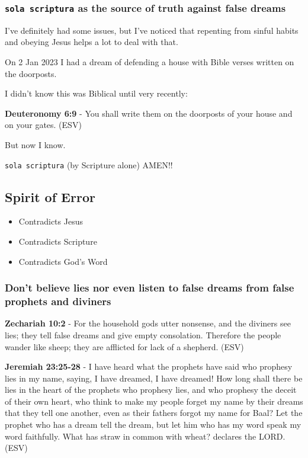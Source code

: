 \documentclass[11pt]{article}
\begin{document}
\subsubsection{\texttt{sola scriptura} as the source of truth against false dreams}
\label{sec:org92f1604}
I've definitely had some issues, but I've noticed that repenting from sinful habits and obeying Jesus helps a lot to deal with that.

On 2 Jan 2023 I had a dream of defending a house with Bible verses written
on the doorposts.

I didn't know this was Biblical until very recently:

\textbf{Deuteronomy 6:9} -  You shall write them on the doorposts of your house and on your gates.  (ESV)

But now I know.

\texttt{sola scriptura} (by Scripture alone) AMEN!!

\subsection{Spirit of Error}
\label{sec:orgfbdda8d}
\begin{itemize}
\item Contradicts Jesus
\item Contradicts Scripture
\item Contradicts God's Word
\end{itemize}

\subsubsection{Don't believe lies nor even listen to false dreams from false prophets and diviners}
\label{sec:orgfb35cd1}
\textbf{Zechariah 10:2} - For the household gods utter nonsense, and the diviners see lies; they tell false dreams and give empty consolation. Therefore the people wander like sheep; they are afflicted for lack of a shepherd. (ESV)

\textbf{Jeremiah 23:25-28} -  I have heard what the prophets have said who prophesy lies in my name, saying, I have dreamed, I have dreamed! How long shall there be lies in the heart of the prophets who prophesy lies, and who prophesy the deceit of their own heart, who think to make my people forget my name by their dreams that they tell one another, even as their fathers forgot my name for Baal?  Let the prophet who has a dream tell the dream, but let him who has my word speak my word faithfully.  What has straw in common with wheat?  declares the LORD.  (ESV)
\end{document}
